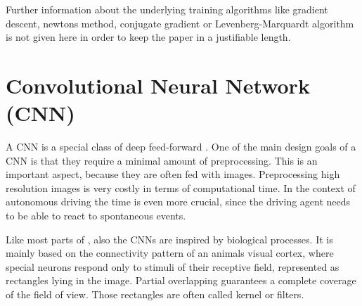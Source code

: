 Further information about the underlying training algorithms like gradient descent, newtons method, conjugate gradient or Levenberg-Marquardt algorithm is not given here in order to keep the paper in a justifiable length.  


\section{Convolutional Neural Network (CNN)}\label{sec:CNN}

A CNN is a special class of deep feed-forward \nns. One of the main design goals of a CNN is that they require a minimal amount of preprocessing. This is an important aspect, because they are often fed with images. Preprocessing high resolution images is very costly in terms of computational time. In the context of autonomous driving the time is even more crucial, since the driving agent needs to be able to react to spontaneous events.

Like most parts of \nns, also the CNNs are inspired by biological processes. It is mainly based on the connectivity pattern of an animals visual cortex, where special neurons respond only to stimuli of their receptive field, represented as rectangles lying in the image. Partial overlapping guarantees a complete coverage of the field of view. Those rectangles are often called kernel or filters.\cite{matsugu2003subject}


